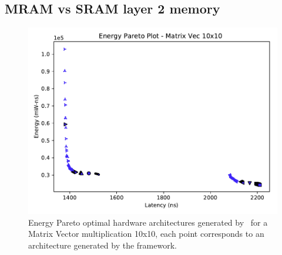 \subsection{MRAM vs SRAM layer 2 memory}
\label{ssec:case_study2}
\begin{figure}[tb] 
\centering
\includegraphics[width=\columnwidth]{graphs/EnergyParetoMatrixVec10.pdf}
    \caption{\small Energy Pareto optimal hardware architectures generated by \frameworkname~for a Matrix Vector multiplication 10x10, each point corresponds to an architecture generated by the framework.}
\label{fig:sram_vs_mram_pareto_vec}
\end{figure}

